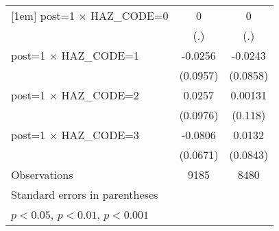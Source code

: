 {\begin{tabular}{l*{2}{c}}
[1em]
post=1 $\times$ HAZ\_CODE=0&           0         &           0         \\
                    &         (.)         &         (.)         \\
[1em]
post=1 $\times$ HAZ\_CODE=1&     -0.0256         &     -0.0243         \\
                    &    (0.0957)         &    (0.0858)         \\
[1em]
post=1 $\times$ HAZ\_CODE=2&      0.0257         &     0.00131         \\
                    &    (0.0976)         &     (0.118)         \\
[1em]
post=1 $\times$ HAZ\_CODE=3&     -0.0806         &      0.0132         \\
                    &    (0.0671)         &    (0.0843)         \\
\hline
Observations        &        9185         &        8480         \\
\hline\hline
\multicolumn{3}{l}{\footnotesize Standard errors in parentheses}\\
\multicolumn{3}{l}{\footnotesize \sym{*} \(p<0.05\), \sym{**} \(p<0.01\), \sym{***} \(p<0.001\)}\\
\end{tabular}
}
